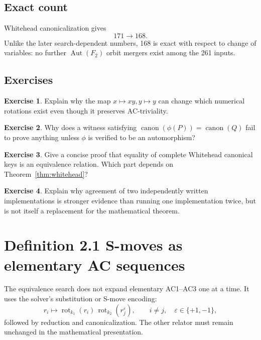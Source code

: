 \documentclass[11pt]{article}
\theoremstyle{definition}
\newtheorem{exercise}{Exercise}[section]
\theoremstyle{remark}
\newcommand{\F}{F_2}
\newcommand{\Aut}{\operatorname{Aut}}
\newcommand{\rot}{\operatorname{rot}}
\newcommand{\canon}{\operatorname{canon}}
\newcommand{\eps}{\varepsilon}
\begin{document}
\subsection{Exact count}

Whitehead canonicalization gives
\[
  171\longrightarrow168.
\]
Unlike the later search-dependent numbers, 168 is exact with respect to
change of variables: no further \(\Aut(\F)\) orbit mergers exist among the
261 inputs.

\subsection*{Exercises}

\begin{exercise}
Explain why the map \(x\mapsto xy,y\mapsto y\) can change which numerical
rotations exist even though it preserves AC-triviality.
\end{exercise}

\begin{exercise}
Why does a witness satisfying
\(\canon(\phi(P))=\canon(Q)\) fail to prove anything unless \(\phi\) is
verified to be an automorphism?
\end{exercise}

\begin{exercise}
Give a concise proof that equality of complete Whitehead canonical keys is
an equivalence relation.  Which part depends on
Theorem~\ref{thm:whitehead}?
\end{exercise}

\begin{exercise}
Explain why agreement of two independently written implementations is
stronger evidence than running one implementation twice, but is not itself
a replacement for the mathematical theorem.
\end{exercise}

\section{Definition 2.1 S-moves as elementary AC sequences}
\label{sec:smove}

The equivalence search does not expand elementary AC1--AC3 one at a time.
It uses the solver's substitution or S-move encoding:
\[
  r_i\longmapsto
  \rot_{k_1}(r_i)\,
  \rot_{k_2}(r_j^\eps),
  \qquad i\ne j,\quad \eps\in\{+1,-1\},
\]
followed by reduction and canonicalization.  The other relator must remain
unchanged in the mathematical presentation.
\end{document}

